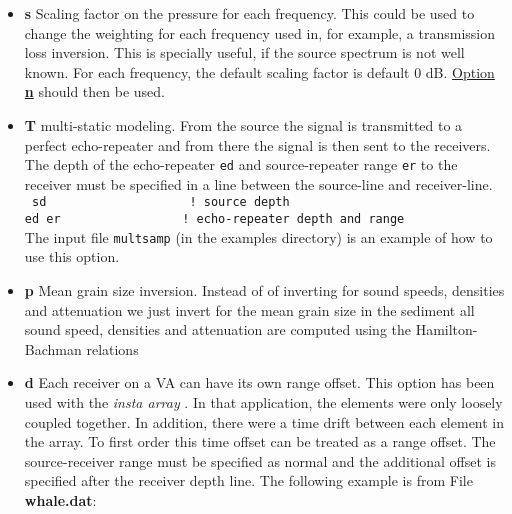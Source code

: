 \documentclass{saclantc}
\begin{document}
\begin{itemize}
\item{\bf s} Scaling factor on the pressure for each frequency. This
  could be used to change the weighting for each frequency used in,
  for example, a transmission loss inversion. This is specially useful, if the source spectrum is not well known. 
For each frequency, the default scaling factor is default 0 dB. 
 \underline{Option \bf n} should then be used.
\item{\bf T} multi-static modeling. From the source the signal is transmitted to a perfect echo-repeater and from there the signal is then sent to the receivers.
The depth of the echo-repeater {\tt ed} and source-repeater range {\tt er} to the receiver must be specified in a line between the source-line and receiver-line.\\
{\tt
sd      ~~~~~~~~~~~~~~~~~~      ! source depth\\
ed er       ~~~~~~~~~~~~~~~       ! echo-repeater depth and range\\
}
 The input file {\tt multsamp} (in the examples directory) is an example of how to use this option.

\item{\bf p} Mean grain size inversion. Instead of of inverting for
sound speeds, densities and attenuation we just invert for the mean
grain size in the sediment all sound speed, densities and attenuation
are computed using the Hamilton-Bachman relations\cite{hamilton80,bachman89}

\item{\bf d} Each receiver on a VA can have its own range offset. This
  option has been used with the {\it insta array} \cite{thode05}. In
  that application, the elements were only loosely coupled together. In
  addition, there were a time drift between each element in the
  array. To first
  order this time offset can be treated as a range offset. The
  source-receiver range must be specified as normal and the additional
  offset is specified after the receiver depth line. The following
  example is from File {\bf whale.dat}:\\
 

\end{itemize}
\end{document}
